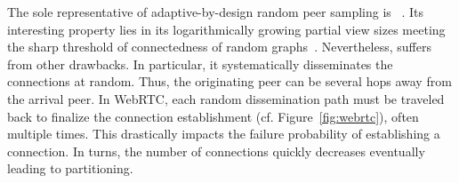 The sole representative of adaptive-by-design random peer sampling is
\SCAMP~\cite{ganesh2003peer}. Its interesting property lies in its
logarithmically growing partial view sizes meeting the sharp threshold of
connectedness of random graphs~\cite{erdos1959random}. Nevertheless, \SCAMP
suffers from other drawbacks. In particular, it systematically disseminates the
connections at random. Thus, the originating peer can be several hops away from
the arrival peer. In WebRTC, each random dissemination path must be traveled
back to finalize the connection establishment (cf. Figure~\ref{fig:webrtc}),
often multiple times. This drastically impacts the \SCAMP failure probability of
establishing a connection. In turns, the number of connections quickly decreases
eventually leading to partitioning.


